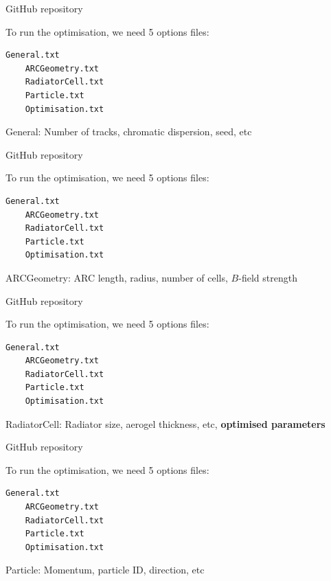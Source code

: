 \documentclass{beamer}
\begin{document}
\begin{frame}[fragile]{GitHub repository}
  \begin{center}
    To run the optimisation, we need 5 options files:
  \end{center}
  \begin{lstlisting}[language=bash, breaklines=true]
    General.txt
    ARCGeometry.txt
    RadiatorCell.txt
    Particle.txt
    Optimisation.txt
  \end{lstlisting}
  \begin{center}
    General: Number of tracks, chromatic dispersion, seed, etc
  \end{center}
\end{frame}

\begin{frame}[fragile]{GitHub repository}
  \begin{center}
    To run the optimisation, we need 5 options files:
  \end{center}
  \begin{lstlisting}[language=bash, breaklines=true]
    General.txt
    ARCGeometry.txt
    RadiatorCell.txt
    Particle.txt
    Optimisation.txt
  \end{lstlisting}
  \begin{center}
    ARCGeometry: ARC length, radius, number of cells, $B$-field strength
  \end{center}
\end{frame}

\begin{frame}[fragile]{GitHub repository}
  \begin{center}
    To run the optimisation, we need 5 options files:
  \end{center}
  \begin{lstlisting}[language=bash, breaklines=true]
    General.txt
    ARCGeometry.txt
    RadiatorCell.txt
    Particle.txt
    Optimisation.txt
  \end{lstlisting}
  \begin{center}
    RadiatorCell: Radiator size, aerogel thickness, etc, \textbf{optimised parameters}
  \end{center}
\end{frame}

\begin{frame}[fragile]{GitHub repository}
  \begin{center}
    To run the optimisation, we need 5 options files:
  \end{center}
  \begin{lstlisting}[language=bash, breaklines=true]
    General.txt
    ARCGeometry.txt
    RadiatorCell.txt
    Particle.txt
    Optimisation.txt
  \end{lstlisting}
  \begin{center}
    Particle: Momentum, particle ID, direction, etc
  \end{center}
\end{frame}
\end{document}

